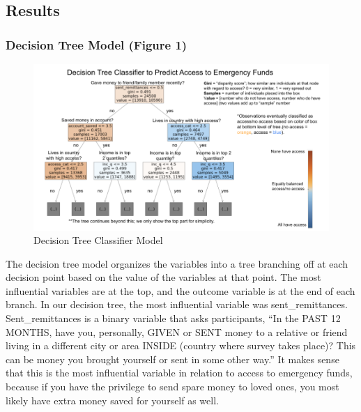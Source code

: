\documentclass[water,article,submit,moreauthors,pdftex]{mdpi}
\begin{document}
\hypertarget{results}{%
\subsection{Results}\label{results}}

\hypertarget{decision-tree-model-figure-1}{%
\subsubsection{Decision Tree Model (Figure
1)}\label{decision-tree-model-figure-1}}

\begin{figure}
\centering
\includegraphics[width=\textwidth,height=0.5\textheight]{images/decision_tree_annotated.png}
\caption{Decision Tree Classifier Model}
\end{figure}

The decision tree model organizes the variables into a tree branching
off at each decision point based on the value of the variables at that
point. The most influential variables are at the top, and the outcome
variable is at the end of each branch. In our decision tree, the most
influential variable was sent\_remittances. Sent\_remittances is a
binary variable that asks participants, ``In the PAST 12 MONTHS, have
you, personally, GIVEN or SENT money to a relative or friend living in a
different city or area INSIDE (country where survey takes place)? This
can be money you brought yourself or sent in some other way.'' It makes
sense that this is the most influential variable in relation to access
to emergency funds, because if you have the privilege to send spare
money to loved ones, you most likely have extra money saved for yourself
as well.
\end{document}
